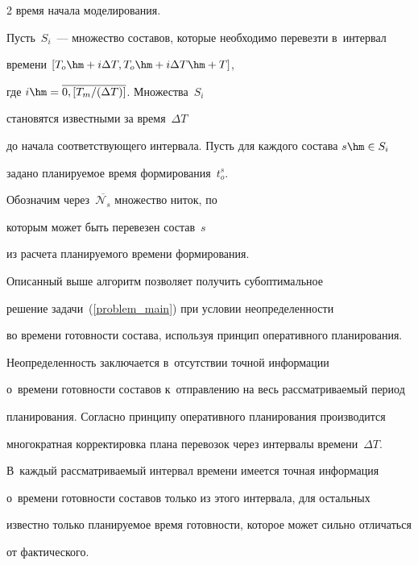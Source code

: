 \begin{multicols}{2}
время начала моделирования.


Пусть~$S_i$~--- множество составов, которые необходимо перевезти в~интервал 


времени $[T_o\hm + i\Delta T, T_o \hm+ i\Delta T \hm+ T]$,


где $i \hm= \overline{0, [{T_m}/({\Delta T}) ]}$. Множества~$S_i$ 


становятся известными за время~$\Delta T$


до начала соответствующего интервала. Пусть для каждого состава $s \hm\in S_i$ 


задано планируемое время формирования~$t^s_o$.


Обозначим через~$\overline{\mathcal N_s}$ множество ниток, по 


которым может быть перевезен состав~$s$


из расчета планируемого времени фор\-ми\-ро\-вания.


{ %





}











Описанный выше алгоритм позволяет получить субоптимальное 


решение задачи~(\ref{problem_main}) при условии неопределенности


во времени готовности состава, используя принцип оперативного планирования. 


Неопределенность заключается в~отсутствии точной информации 


о~времени готовности составов к~отправлению на весь рассматриваемый период 


планирования. Согласно принципу оперативного планирования производится 


многократная корректировка плана перевозок через интервалы времени~$\Delta T$. 


В~каждый рассматриваемый интервал времени имеется точная информация 


о~времени готовности составов только из этого интервала, для остальных 


известно только планируемое время готовности, которое может сильно отличаться 


от фактического.






\end{multicols}
